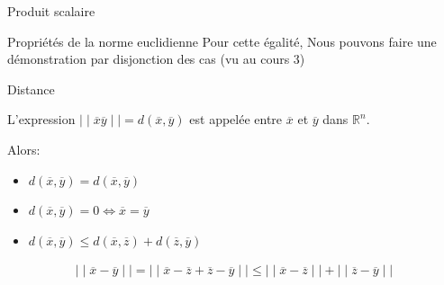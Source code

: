 \begin{parag}{Produit scalaire}
\begin{subparag}{Propriétés de la norme euclidienne}
       Pour cette égalité, Nous pouvons faire une démonstration par disjonction des cas (vu au cours 3)
   \end{subparag} 
\end{parag}

\begin{parag}{Distance}
    \begin{definition}
        L'expression $ \mid \mid \overline{x} \overline{y} \mid \mid = d( \overline{x}, \overline{y})$ est appelée  entre $ \overline{x}$ et $ \overline{y}$ dans $ \mathbb{R}^n$.
    \end{definition}
    Alors:
    \begin{itemize}
        \item $d( \overline{x}, \overline{y}) = d( \overline{x}, \overline{y})$
        \item $d( \overline{x}, \overline{y}) = 0 \iff \overline{x} = \overline{y}$
        \item $d( \overline{x}, \overline{y}) \leq d ( \overline{x}, \overline{z}) + d( \overline{z}, \overline{y})$
    \end{itemize}
    \begin{align*}
        \mid \mid \overline{x} - \overline{y} \mid \mid = \mid \mid \overline{x} - \overline{z} + \overline{z} - \overline{y} \mid \mid \leq \mid  \mid \overline{x} - \overline{z} \mid \mid + \mid \mid \overline{z} - \overline{y} \mid \mid
    \end{align*}
    

\end{parag}
